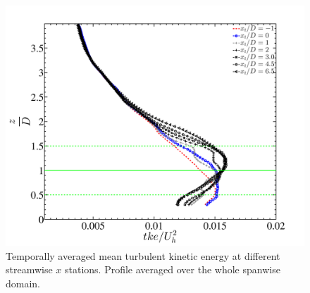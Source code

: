 \begin{figure}
\centering
\includegraphics[width = 0.8\linewidth]{stats/tkeprof_Npoints_avg.pdf}
\caption[Mean tke at $x$ stations 3]{Temporally averaged mean turbulent kinetic energy at different streamwise $x$ stations. Profile averaged over the whole spanwise domain.}\label{fig:tkestat3}
\end{figure}

